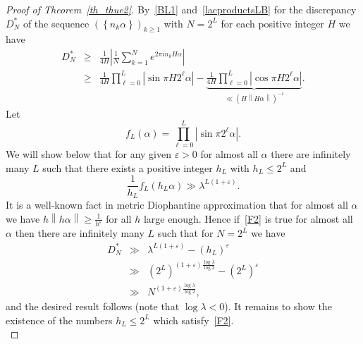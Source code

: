 \documentclass[12pt]{amsart}
\newcommand {\ve} {\varepsilon}
\begin{document}
\begin{proof}[Proof of Theorem~\ref{th_thue2}]
By~\eqref{BL1} and~\eqref{lacproductsLB} for the discrepancy $D^{*}_{N}$ of the sequence $(\left\{n_{k} \alpha\right\})_{k \geq 1}$ with $N=2^{L}$ for each positive integer $H$ we have 
\begin{eqnarray*}
D^{*}_{N} & \geq & \frac{1}{4H} \left|\frac{1}{N} \sum^{N}_{k=1} e^{2 \pi i n_{k} H \alpha }\right| \\
& \geq & \frac{1}{4H} \prod^{L}_{\ell=0} \left|\sin \pi H 2^{\ell} \alpha \right|- \underbrace{\frac{1}{4H} \prod^{L}_{\ell=0} \left|\cos \pi H 2^{\ell} \alpha \right|}_{\ll(H \left\|H \alpha \right\|)^{-1}}.
\end{eqnarray*}
Let
$$
f_L (\alpha) = \prod^{L}_{\ell=0} \left|\sin \pi 2^{\ell} \alpha \right|.
$$
We will show below that for any given $\varepsilon > 0$ for almost all $\alpha$ there are infinitely many $L$ such that there exists a positive integer $h_{L}$ with $h_{L} \leq 2^{L}$ and
\begin{equation} \label{F2}
\frac{1}{h_{L}} f_{L} \left(h_L \alpha \right) \gg \lambda^{L(1+\ve)}.
\end{equation}
It is a well-known fact in metric Diophantine approximation that for almost all $\alpha$ we have $h \left\|h \alpha \right\| \geq \frac{1}{h^{\ve}}$ for all $h$ large enough. Hence if~\eqref{F2} is true for almost all $\alpha$ then there are infinitely many $L$ such that for $N=2^{L}$ we have
\begin{eqnarray}
D^{*}_{N} & \gg & \lambda^{L(1+\ve)} - \left(h_{L}\right)^{\varepsilon} \label{HL}\\
 & \gg & \left(2^{L}\right)^{\left(1+ \varepsilon\right) \frac{\log \lambda}{\log 2}} - \left(2^{L}\right)^{\varepsilon}\nonumber\\
& \gg & N^{\left(1+ \varepsilon\right) \frac{\log \lambda}{\log 2}}\nonumber,
\end{eqnarray}
and the desired result follows (note that $\log \lambda <0$). It remains to show the existence of the numbers $h_{L} \leq 2^{L}$ which satisfy~\eqref{F2}.\\


\end{proof}
\end{document}
